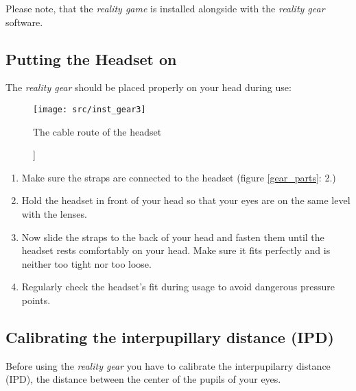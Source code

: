 Please note, that the \emph{\poke{} reality game} is installed alongside with the \emph{\poke{} reality gear} software.

\subsection{Putting the Headset on}
The \emph{\poke{} reality gear} should be placed properly on your head during use:
\begin{figure}[!ht]
\begin{center}
\texttt{[image: src/inst\_gear3]}
\end{center}
\caption]{The cable route of the headset}
\label{gear_cable}
\end{figure}
\begin{enumerate}
\item Make sure the straps are connected to the headset (figure \ref{gear_parts}: 2.)
\item Hold the headset in front of your head so that your eyes are on the same level with the lenses.
\item Now slide the straps to the back of your head and fasten them until the headset rests comfortably on your head. Make sure it fits perfectly and is neither too tight nor too loose.
\item Regularly check the headset's fit during usage to avoid dangerous pressure points.
\end{enumerate}

\subsection{Calibrating the interpupillary distance (IPD)}

Before using the \emph{\poke{} reality gear} you have to calibrate the interpupilarry distance (IPD), the distance between the center of the pupils of your eyes.

